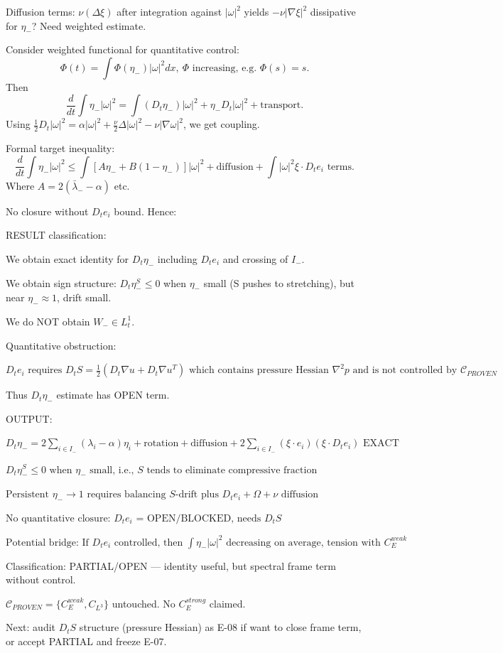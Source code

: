 \documentclass[11pt]{article}
\begin{document}
Diffusion terms: $\nu(\Delta\xi)$ after integration against $|\omega|^2$ yields $-\nu|\nabla\xi|^2$ dissipative for $\eta_-$? Need weighted estimate.

Consider weighted functional for quantitative control:
\begin{equation*}
\Phi(t)=\int \Phi(\eta_-)|\omega|^2 dx,\ \Phi\text{ increasing, e.g. }\Phi(s)=s.
\end{equation*}
Then
\begin{equation*}
\frac{d}{dt}\int \eta_-|\omega|^2 = \int (D_t\eta_-)|\omega|^2 + \eta_- D_t|\omega|^2 + \text{transport}.
\end{equation*}
Using $\frac12 D_t|\omega|^2 = \alpha|\omega|^2 + \frac{\nu}{2}\Delta|\omega|^2 -\nu|\nabla\omega|^2$, we get coupling.

Formal target inequality:
\begin{equation*}
\boxed{\frac{d}{dt}\int \eta_-|\omega|^2 \le \int [A\eta_- + B(1-\eta_-)]|\omega|^2 + \text{diffusion} + \int |\omega|^2 \xi\cdot D_t e_i\text{ terms}}.
\end{equation*}
Where $A=2(\bar\lambda_- -\alpha)$ etc.

No closure without $D_t e_i$ bound. Hence:

RESULT classification:

We obtain exact identity for $D_t\eta_-$ including $D_t e_i$ and crossing of $I_-$.

We obtain sign structure: $D_t\eta_-^{S}\le0$ when $\eta_-$ small (S pushes to stretching), but near $\eta_-\approx1$, drift small.

We do NOT obtain $W_-\in L^1_t$.

Quantitative obstruction:

$\boxed{D_t e_i \text{ requires } D_t S = \frac12(D_t\nabla u + D_t\nabla u^T) \text{ which contains pressure Hessian } \nabla^2 p \text{ and is not controlled by } \mathcal{C}_{PROVEN}}$

Thus $D_t\eta_-$ estimate has OPEN term.

OUTPUT:

$\boxed{D_t\eta_-=2\sum_{i\in I_-}(\lambda_i-\alpha)\eta_i + \text{rotation}+\text{diffusion}+2\sum_{i\in I_-}(\xi\cdot e_i)(\xi\cdot D_t e_i)\text{ EXACT}}$

$\boxed{D_t\eta_-^{S}\le0\text{ when }\eta_-\text{ small, i.e., }S\text{ tends to eliminate compressive fraction}}$

$\boxed{\text{Persistent }\eta_-\to1\text{ requires balancing }S\text{-drift plus }D_t e_i+\Omega+\nu\text{ diffusion}}$

$\boxed{\text{No quantitative closure: }D_t e_i\text{ = OPEN/BLOCKED, needs }D_t S}$

$\boxed{\text{Potential bridge: If }D_t e_i\text{ controlled, then }\int\eta_-|\omega|^2\text{ decreasing on average, tension with }C_E^{weak}}$

Classification: PARTIAL/OPEN — identity useful, but spectral frame term without control.

$\mathcal{C}_{PROVEN}=\{C_E^{weak},C_{L^3}\}$ untouched. No $C_E^{strong}$ claimed.

Next: audit $D_t S$ structure (pressure Hessian) as E-08 if want to close frame term, or accept PARTIAL and freeze E-07.
\end{document}
